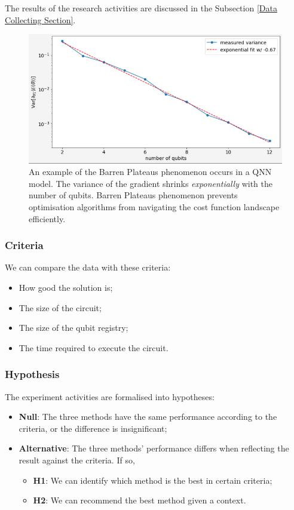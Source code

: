 The results of the research activities are discussed in the Subsection \ref{Data Collecting Section}.

\label{Research Activities section}
\begin{figure}
    \includegraphics[width=\textwidth]{./ResearchDesign/Appendices/VarianceShrinking.png}
    \caption{
        An example of the Barren Plateaus phenomenon occurs in a QNN model. 
        The variance of the gradient shrinks \textit{exponentially} with the number of qubits. 
        Barren Plateaus phenomenon prevents optimisation algorithms from navigating the cost function landscape efficiently.
    }
    \label{Variance Shrinking demo}
\end{figure}


\subsubsection{Criteria}
\label{Criteria section}
We can compare the data with these criteria:
\begin{itemize}
    \item How good the solution is;
    \item The size of the circuit;
    \item The size of the qubit registry;
    \item The time required to execute the circuit.
\end{itemize}

\subsubsection{Hypothesis}
The experiment activities are formalised into hypotheses:
\begin{itemize}
    \item \textbf{Null}: The three methods have the same performance according to the criteria, or the difference is insignificant;
    \item \textbf{Alternative}: The three methods' performance differs when reflecting the result against the criteria. If so,
    \begin{itemize}
        \item \textbf{H1}: We can identify which method is the best in certain criteria;
        \item \textbf{H2}: We can recommend the best method given a context.
    \end{itemize}
\end{itemize}

